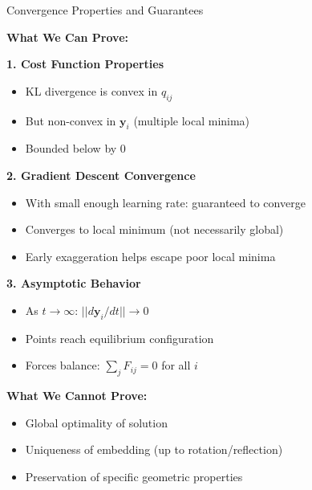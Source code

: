 \documentclass[10pt]{beamer}
\begin{document}
\begin{frame}{Convergence Properties and Guarantees}

\textbf{What We Can Prove:}

\vspace{0.2cm}
\textbf{1. Cost Function Properties}
\begin{itemize}
    \setlength\itemsep{0em}
    \item KL divergence is convex in $q_{ij}$
    \item But non-convex in $\mathbf{y}_i$ (multiple local minima)
    \item Bounded below by 0
\end{itemize}

\vspace{0.15cm}
\textbf{2. Gradient Descent Convergence}
\begin{itemize}
    \setlength\itemsep{0em}
    \item With small enough learning rate: guaranteed to converge
    \item Converges to local minimum (not necessarily global)
    \item Early exaggeration helps escape poor local minima
\end{itemize}

\vspace{0.15cm}
\textbf{3. Asymptotic Behavior}
\begin{itemize}
    \setlength\itemsep{0em}
    \item As $t \rightarrow \infty$: $||d\mathbf{y}_i/dt|| \rightarrow 0$
    \item Points reach equilibrium configuration
    \item Forces balance: $\sum_j F_{ij} = 0$ for all $i$
\end{itemize}

\vspace{0.15cm}
\textbf{What We Cannot Prove:}
\begin{itemize}
    \setlength\itemsep{0em}
    \item Global optimality of solution
    \item Uniqueness of embedding (up to rotation/reflection)
    \item Preservation of specific geometric properties
\end{itemize}

\end{frame}
\end{document}
